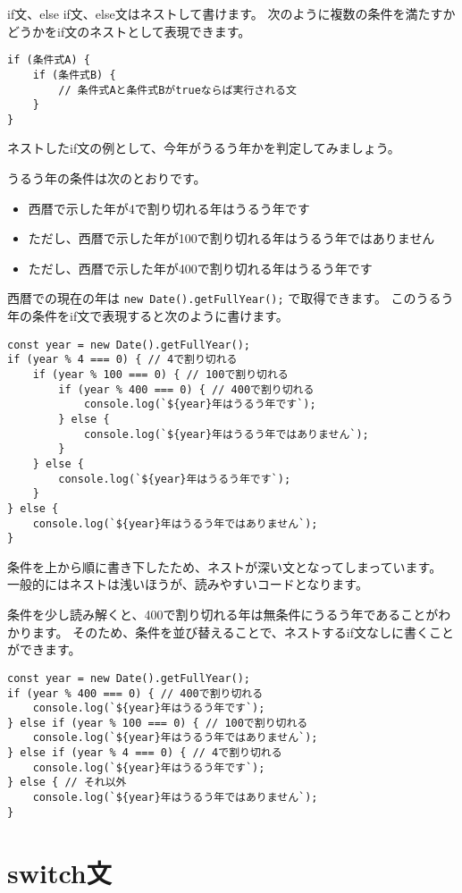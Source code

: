 if文、else if文、else文はネストして書けます。
次のように複数の条件を満たすかどうかをif文のネストとして表現できます。

\begin{lstlisting}
if (条件式A) {
    if (条件式B) {
        // 条件式Aと条件式Bがtrueならば実行される文
    }
}
\end{lstlisting}

ネストしたif文の例として、今年がうるう年かを判定してみましょう。

うるう年の条件は次のとおりです。

\begin{itemize}
\item
  西暦で示した年が4で割り切れる年はうるう年です
\item
  ただし、西暦で示した年が100で割り切れる年はうるう年ではありません
\item
  ただし、西暦で示した年が400で割り切れる年はうるう年です
\end{itemize}

西暦での現在の年は \texttt{new Date().getFullYear();}
で取得できます。
このうるう年の条件をif文で表現すると次のように書けます。

\begin{lstlisting}
const year = new Date().getFullYear();
if (year % 4 === 0) { // 4で割り切れる
    if (year % 100 === 0) { // 100で割り切れる
        if (year % 400 === 0) { // 400で割り切れる
            console.log(`${year}年はうるう年です`);
        } else {
            console.log(`${year}年はうるう年ではありません`);
        }
    } else {
        console.log(`${year}年はうるう年です`);
    }
} else {
    console.log(`${year}年はうるう年ではありません`);
}
\end{lstlisting}

条件を上から順に書き下したため、ネストが深い文となってしまっています。
一般的にはネストは浅いほうが、読みやすいコードとなります。

\enlargethispage{\baselineskip}条件を少し読み解くと、400で割り切れる年は無条件にうるう年であることがわかります。
そのため、条件を並び替えることで、ネストするif文なしに書くことができます。

\begin{lstlisting}
const year = new Date().getFullYear();
if (year % 400 === 0) { // 400で割り切れる
    console.log(`${year}年はうるう年です`);
} else if (year % 100 === 0) { // 100で割り切れる
    console.log(`${year}年はうるう年ではありません`);
} else if (year % 4 === 0) { // 4で割り切れる
    console.log(`${year}年はうるう年です`);
} else { // それ以外
    console.log(`${year}年はうるう年ではありません`);
}
\end{lstlisting}
\vspace{-3mm}
\hypertarget{switch-statement}{%
\section{switch文}\label{switch-statement}}

